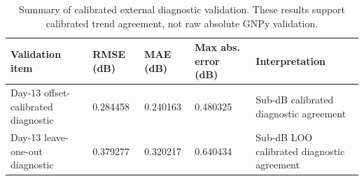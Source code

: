 \begin{table}
\caption{Summary of calibrated external diagnostic validation. These results support calibrated trend agreement, not raw absolute GNPy validation.}
\label{tab:validation-summary}
\begin{tabular}{lllll}
\toprule
Validation item & RMSE (dB) & MAE (dB) & Max abs. error (dB) & Interpretation \\
\midrule
Day-13 offset-calibrated diagnostic & 0.284458 & 0.240163 & 0.480325 & Sub-dB calibrated diagnostic agreement \\
Day-13 leave-one-out diagnostic & 0.379277 & 0.320217 & 0.640434 & Sub-dB LOO calibrated diagnostic agreement \\
\bottomrule
\end{tabular}
\end{table}
